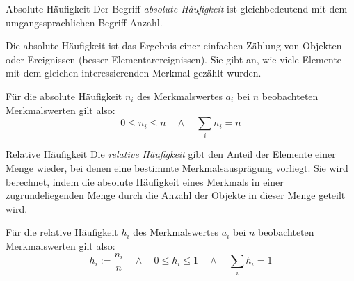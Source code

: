 \begin{defi}{Absolute Häufigkeit}
    Der Begriff \emph{absolute Häufigkeit} ist gleichbedeutend mit dem umgangssprachlichen Begriff Anzahl.

    Die absolute Häufigkeit ist das Ergebnis einer einfachen Zählung von Objekten oder Ereignissen (besser Elementarereignissen). Sie gibt an, wie viele Elemente mit dem gleichen interessierenden Merkmal gezählt wurden.

    Für die absolute Häufigkeit $n_i$ des Merkmalswertes $a_i$ bei $n$ beobachteten Merkmalswerten gilt also:
    \[
        0 \leq n_i \leq n \quad \land \quad \sum_i n_i = n
    \]
\end{defi}

\begin{defi}{Relative Häufigkeit}
    Die \emph{relative Häufigkeit} gibt den Anteil der Elemente einer Menge wieder, bei denen eine bestimmte Merkmalsausprägung vorliegt.
    Sie wird berechnet, indem die absolute Häufigkeit eines Merkmals in einer zugrundeliegenden Menge durch die Anzahl der Objekte in dieser Menge geteilt wird.

    Für die relative Häufigkeit $h_i$ des Merkmalswertes $a_i$ bei $n$ beobachteten Merkmalswerten gilt also:
    \[
        h_i := \frac{n_i}{n} \quad \land \quad 0 \leq h_i \leq 1 \quad \land \quad \sum_i h_i = 1
    \]
\end{defi}

